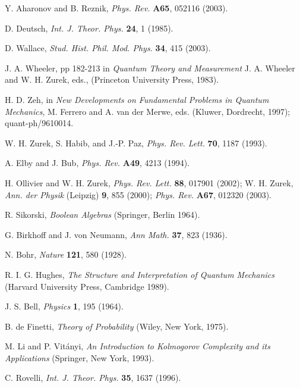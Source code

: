 \documentclass[aps,twocolumn,pra,epsfig]{revtex4}
\begin{document}
\noindent[34] Y. Aharonov and B. Reznik, {\it Phys. Rev.} {\bf A65}, 
052116 (2003).


\noindent[35] D. Deutsch, {\it Int. J. Theor. Phys.} {\bf 24}, 1 (1985).

\noindent[36] D. Wallace, {\it Stud. Hist. Phil. Mod. Phys.} 
{\bf 34}, 415 (2003).

\noindent[37] J. A. Wheeler, pp 182-213 in {\it Quantum Theory and
Measurement} J. A. Wheeler and W. H. Zurek, eds., 
(Princeton University Press, 1983).

\noindent[38] H. D. Zeh, in {\it New Developments on Fundamental Problems 
in Quantum Mechanics}, M. Ferrero and A. van der Merwe, eds. 
(Kluwer, Dordrecht, 1997); quant-ph/9610014.

\noindent[39] W. H. Zurek, S. Habib, and J.-P. Paz, 
{\it Phys. Rev. Lett.} {\bf 70}, 1187 (1993).

\noindent[40] A. Elby and J. Bub, {\it Phys. Rev.} {\bf A49}, 4213 (1994).

\noindent[41] H. Ollivier and W. H. Zurek, {\it Phys. Rev. Lett.} 
{\bf 88}, 017901 (2002); 
W. H. Zurek, {\it Ann. der Physik} (Leipzig) {\bf 9}, 855 (2000);
{\it Phys. Rev.} {\bf A67}, 012320 (2003).

\noindent[42] R. Sikorski, {\it Boolean Algebras} (Springer, Berlin 1964).

\noindent[43] G. Birkhoff and J. von Neumann, {\it Ann Math.} 
{\bf 37}, 823 (1936).

\noindent[44] N. Bohr, {\it Nature} {\bf 121}, 580 (1928).

\noindent[45] R. I. G. Hughes, {\it The Structure and Interpretation 
of Quantum Mechanics} (Harvard University Press, Cambridge 1989).

\noindent[46] J. S. Bell, {\it Physics} {\bf 1}, 195 (1964).

\noindent[47] B. de Finetti, {\it Theory of Probability} 
(Wiley, New York, 1975).

\noindent[48] M. Li and P. Vit\'anyi, {\it An Introduction 
to Kolmogorov Complexity and
its Applications} (Springer, New York, 1993).

\noindent[49] C. Rovelli, {\it Int. J. Theor. Phys.} {\bf 35}, 1637 (1996).
\end{document}
